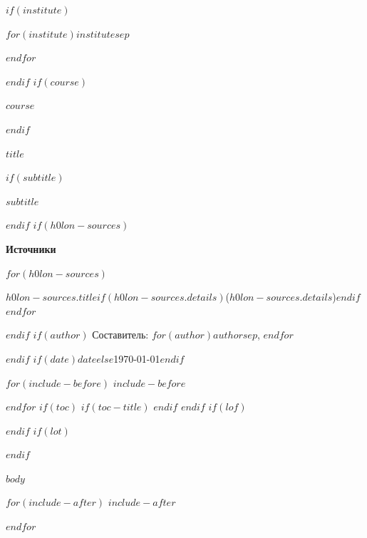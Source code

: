 \documentclass[$if(fontsize)$$fontsize$$else$11pt$endif$,twoside,a4paper$for(classoption)$,$classoption$$endfor$]{article}
\DeclareRobustCommand{\hzsrc}[1]{%
  \kern0.06em\textsuperscript{\textcolor{black!50}{\sffamily\fontsize{6.5pt}{7pt}\selectfont #1}}}
\DeclareRobustCommand{\hzsrcinline}[1]{%
  \textcolor{black!50}{\sffamily\fontsize{7.5pt}{9pt}\selectfont #1}}
\begin{document}
\begin{titlepage}
  \thispagestyle{empty}
  \centering
$if(institute)$
  {\large $for(institute)$$institute$$sep$\par $endfor$\par}
  \vspace{0.8\baselineskip}
$endif$
$if(course)$
  {\large\itshape $course$\par}
$endif$
  {\bfseries\LARGE $title$\par}
$if(subtitle)$
  \vspace{1.5\baselineskip}
  {\large $subtitle$\par}
$endif$
$if(h0lon-sources)$
  \begin{minipage}{0.84\textwidth}
    \small
    \textbf{Источники}\par\smallskip
    \begin{description}[leftmargin=3.2em,labelwidth=2.7em,labelsep=0.5em,
                        font=\normalfont\bfseries,itemsep=1pt,topsep=0pt]
$for(h0lon-sources)$
      \item[$h0lon-sources.id$] $h0lon-sources.title$$if(h0lon-sources.details)$\enspace\textcolor{black!55}{($h0lon-sources.details$)}$endif$
$endfor$
    \end{description}
  \end{minipage}\par
$endif$
$if(author)$
  Составитель: $for(author)$$author$$sep$, $endfor$\par
  \medskip
$endif$
  $if(date)$$date$$else$\today$endif$\par
\end{titlepage}

$for(include-before)$
$include-before$

$endfor$
$if(toc)$
$if(toc-title)$
\renewcommand*\contentsname{$toc-title$}
$endif$
{%
  \DeclareRobustCommand{\hzsrc}[1]{}%
  \DeclareRobustCommand{\hzsrcinline}[1]{}%
  \setcounter{tocdepth}{$if(toc-depth)$$toc-depth$$else$2$endif$}%
  \tableofcontents
}
\clearpage
$endif$
$if(lof)$
\listoffigures
$endif$
$if(lot)$
\listoftables
$endif$

$body$

$for(include-after)$
$include-after$

$endfor$
\end{document}
